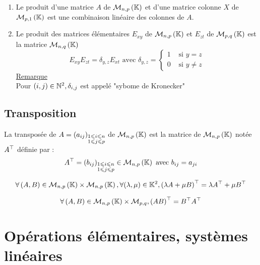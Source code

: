 \begin{defprop}
    \begin{enumerate}
        \item Le produit d'une matrice \(A\) de \(\mathcal{M}_{n,p}\left(\mathbb{K}\right)\) et d'une matrice colonne \(X\) de \(\mathcal{M}_{p,1}\left(\mathbb{K}\right)\) est une combinaison linéaire des colonnes de \(A\).
        \item Le produit des matrices élémentaires \(E_{xy}\) de \(\mathcal{M}_{n,p}\left(\mathbb{K}\right)\) et \(E_{zt}\) de \(\mathcal{M}_{p,q}\left(\mathbb{K}\right)\) est la matrice \(\mathcal{M}_{n,q}\left(\mathbb{K}\right)\) 
        \[E_{xy}E_{zt} = \delta_{y,z} E_{xt}\text{ avec } \delta_{y,z} = \begin{cases}
            1 & \text{ si } y = z \\
            0 & \text{ si } y \neq z
        \end{cases}\]
        \underline{Remarque}\\
        Pour \(\left(i,j\right) \in \mathbb{N}^2 , \delta_{i,j}\) est appelé "sybome de Kronecker"
    \end{enumerate}
\end{defprop}
\subsection{Transposition}
\begin{defi}
    La transposée de \( A = \left(a_{ij}\right)_{\substack {1\leqslant i \leqslant n \\ 1\leqslant j \leqslant p}}\) de \(\mathcal{M}_{n,p}\left(\mathbb{K}\right)\) est la matrice de \(\mathcal{M}_{n,p}\left(\mathbb{K}\right)\) notée \(A^{\top}\) définie par : 
    \[A^{\top} = \left(b_{ij}\right)_{\substack {1\leqslant i \leqslant n \\ 1\leqslant j \leqslant p}} \in \mathcal{M}_{n,p}\left(\mathbb{K}\right) \text{ avec } b_{ij} = a_{ji}\]
\end{defi}
\begin{defprop}
    \[\forall \left(A,B\right) \in \mathcal{M}_{n,p}\left(\mathbb{K}\right) \times \mathcal{M}_{n,p}\left(\mathbb{K}\right), \forall (\lambda,\mu) \in \mathbb{K}^2 , \left(\lambda A + \mu B\right)^{\top} = \lambda A^{\top} + \mu B^{\top}\]
\end{defprop}

\begin{defprop}
    \[\forall \left(A,B\right) \in \mathcal{M}_{n,p}\left(\mathbb{K}\right) \times \mathcal{M}_{p,q},\left(AB\right)^{\top} = B^{\top}A^{\top}\]
\end{defprop}

\section{Opérations élémentaires, systèmes linéaires}

